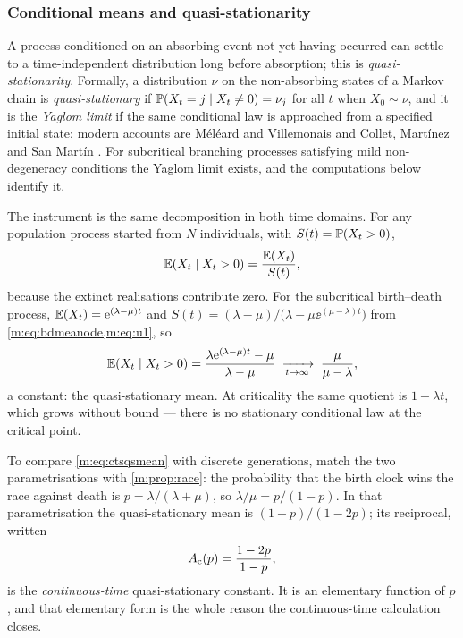 \subsubsection{Conditional means and quasi-stationarity}
\label{m:sec:condmean}

A process conditioned on an absorbing event not yet having occurred can settle
to a time-independent distribution long before absorption; this is
\emph{quasi-stationarity}. Formally, a distribution $\nu$ on the non-absorbing
states of a Markov chain is \emph{quasi-stationary} if
$\mathbb{P}\!\left(X_t=j\mid X_t\neq0\right)=\nu_j$ for all $t$ when $X_0\sim\nu$, and it is the
\emph{Yaglom limit} \cite{Yaglom1947} if the same conditional law is approached
from a specified initial state; modern accounts are Méléard and Villemonais
\cite{Meleard2012} and Collet, Martínez and San Martín \cite{Collet2013}. For
subcritical branching processes satisfying mild non-degeneracy conditions the
Yaglom limit exists, and the computations below identify it.

The instrument is the same decomposition in both time domains. For any
population process started from $N$ individuals, with $S(t)=\mathbb{P}\!\left(X_t>0\right)$,
\begin{equation}
\label{m:eq:conddecomp}
\mathbb{E}\!\left(X_t\mid X_t>0\right) = \frac{\mathbb{E}\!\left(X_t\right)}{S(t)},
\end{equation}
because the extinct realisations contribute zero. For the subcritical
birth--death process, $\mathbb{E}\!\left(X_t\right)=\mathrm{e}^{(\lambda-\mu)t}$ and
$S(t) = (\lambda-\mu)/\bigl(\lambda-\mu\ee^{(\mu-\lambda)t}\bigr)$ from
\cref{m:eq:bdmeanode,m:eq:u1}, so
\begin{equation}
\label{m:eq:ctsqsmean}
\mathbb{E}\!\left(X_t\mid X_t>0\right)
= \frac{\lambda\mathrm{e}^{(\lambda-\mu)t}-\mu}{\lambda-\mu}
\;\xrightarrow[t\to\infty]{}\;
\frac{\mu}{\mu-\lambda},
\end{equation}
a constant: the quasi-stationary mean. At criticality the same quotient is
$1+\lambda t$, which grows without bound --- there is no stationary conditional
law at the critical point.

To compare \cref{m:eq:ctsqsmean} with discrete generations, match the two
parametrisations with \cref{m:prop:race}: the probability that the birth clock
wins the race against death is $p=\lambda/(\lambda+\mu)$, so
$\lambda/\mu=p/(1-p)$. In that parametrisation the quasi-stationary mean is
$(1-p)/(1-2p)$; its reciprocal, written
\begin{equation}
\label{m:eq:Acts}
A_{\mathrm{c}}(p) = \frac{1-2p}{1-p},
\end{equation}
is the \emph{continuous-time} quasi-stationary constant. It is an elementary
function of $p$, and that elementary form is the whole reason the
continuous-time calculation closes.

